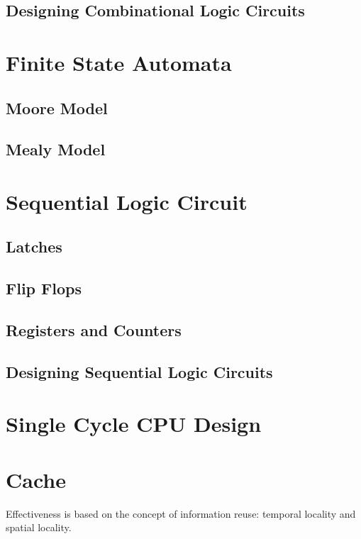 \documentclass[11pt]{article}
\begin{document}
\subsection{Designing Combinational Logic Circuits}

\section{Finite State Automata}

\subsection{Moore Model}

\subsection{Mealy Model}

\section{Sequential Logic Circuit}

\subsection{Latches}

\subsection{Flip Flops}

\subsection{Registers and Counters}

\subsection{Designing Sequential Logic Circuits}

\section{Single Cycle CPU Design}

\section{Cache}

Effectiveness is based on the concept of information reuse: temporal locality and spatial locality.
\end{document}
